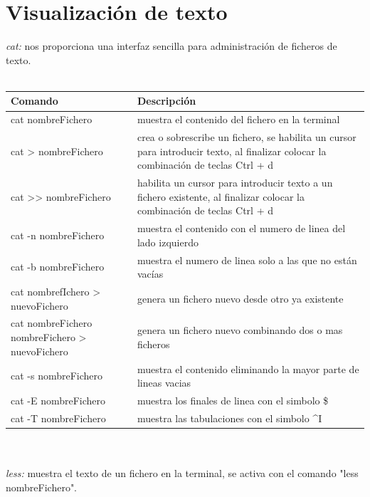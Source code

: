 \documentclass[10pt,a4paper,titlepage]{article}
\begin{document}
	\section*{Visualización de texto}
	\emph{cat:} nos proporciona una interfaz sencilla para administración de ficheros de texto.
	\\ 
	\\
	\begin{tabular}{|p{7cm}|p{7cm}|}
		\hline
		Comando & Descripción \\
		\hline
		cat nombreFichero & muestra el contenido del fichero en la terminal \\
		\hline
		cat > nombreFichero & crea o sobrescribe un fichero, se habilita un cursor para introducir texto, al finalizar colocar la combinación de teclas Ctrl + d \\
		\hline
		cat >> nombreFichero & habilita un cursor para introducir texto a un fichero existente, al finalizar colocar la combinación de teclas Ctrl + d \\
		\hline
		cat -n nombreFichero & muestra el contenido con el numero de linea del lado izquierdo \\
		\hline
		cat -b nombreFichero & muestra el numero de linea solo a las que no están vacías \\
		\hline
		cat nombrefIchero > nuevoFichero & genera un fichero nuevo desde otro ya existente \\
		\hline
		cat nombreFichero nombreFichero > nuevoFichero & genera un fichero nuevo combinando dos o mas ficheros \\
		\hline
		cat -s nombreFichero & muestra el contenido eliminando la mayor parte de lineas vacias \\
		\hline
		cat -E nombreFichero & muestra los finales de linea con el simbolo \$ \\
		\hline
		cat -T nombreFichero & muestra las tabulaciones con el simbolo \textasciicircum I \\
		\hline
	\end{tabular}
	\\
	\\
	\emph{less:} muestra el texto de un fichero en la terminal, se activa con el comando "less nombreFichero".
	\\
	\\
\end{document}
